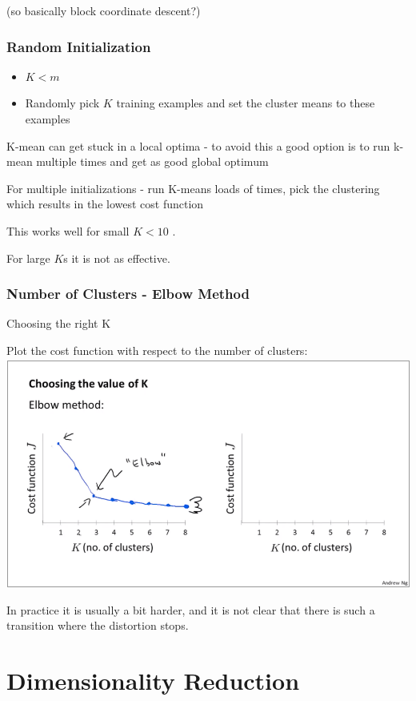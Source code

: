 (so basically block coordinate descent?)

\subsubsection{Random Initialization}

\begin{itemize}
\item $K < m$
\item Randomly pick $K$ training examples and set the cluster means to these examples
\end{itemize}

K-mean can get stuck in a local optima - to avoid this a good option is to run k-mean multiple times and get as good global optimum

For multiple initializations - run K-means loads of times, pick the clustering which results in the lowest cost function

This works well for small $K < 10$ .

For large $K$s it is not as effective.

\subsubsection{Number of Clusters - Elbow Method}

Choosing the right K 

Plot the cost function with respect to the number of clusters:
\includegraphics[width=0.9\columnwidth]{ml_figures/elbow.png}

In practice it is usually a bit harder, and it is not clear that there is such a transition where the distortion stops.

\section{Dimensionality Reduction}

